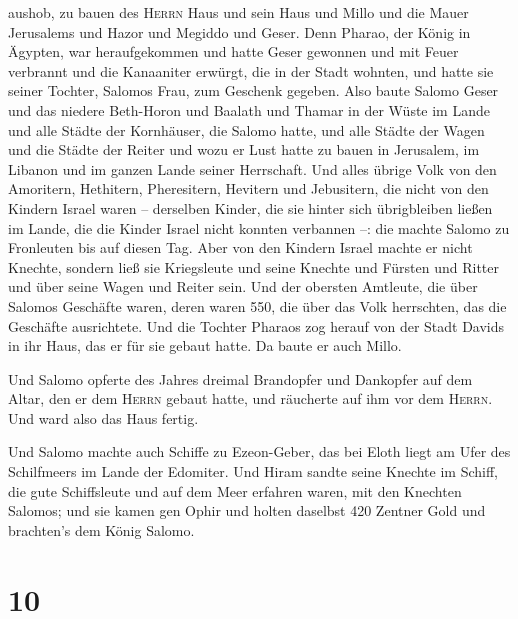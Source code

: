 aushob, zu bauen des \textsc{Herrn} Haus und sein Haus und Millo und die
Mauer Jerusalems und Hazor und Megiddo und Geser.  Denn
Pharao, der König in Ägypten, war heraufgekommen und hatte Geser
gewonnen und mit Feuer verbrannt und die Kanaaniter erwürgt, die in der
Stadt wohnten, und hatte sie seiner Tochter, Salomos Frau, zum Geschenk
gegeben.  Also baute Salomo Geser und das niedere
Beth-Horon  und Baalath und Thamar in der Wüste im Lande
 und alle Städte der Kornhäuser, die Salomo hatte, und
alle Städte der Wagen und die Städte der Reiter und wozu er Lust hatte
zu bauen in Jerusalem, im Libanon und im ganzen Lande seiner Herrschaft.
 Und alles übrige Volk von den Amoritern, Hethitern,
Pheresitern, Hevitern und Jebusitern, die nicht von den Kindern Israel
waren --  derselben Kinder, die sie hinter sich
übrigbleiben ließen im Lande, die die Kinder Israel nicht konnten
verbannen --: die machte Salomo zu Fronleuten bis auf diesen Tag.
 Aber von den Kindern Israel machte er nicht Knechte,
sondern ließ sie Kriegsleute und seine Knechte und Fürsten und Ritter
und über seine Wagen und Reiter sein.  Und der obersten
Amtleute, die über Salomos Geschäfte waren, deren waren 550, die über
das Volk herrschten, das die Geschäfte ausrichtete.  Und
die Tochter Pharaos zog herauf von der Stadt Davids in ihr Haus, das er
für sie gebaut hatte. Da baute er auch Millo.

 Und Salomo opferte des Jahres dreimal Brandopfer und
Dankopfer auf dem Altar, den er dem \textsc{Herrn} gebaut hatte, und
räucherte auf ihm vor dem \textsc{Herrn}. Und ward also das Haus fertig.

 Und Salomo machte auch Schiffe zu Ezeon-Geber, das bei
Eloth liegt am Ufer des Schilfmeers im Lande der Edomiter.
 Und Hiram sandte seine Knechte im Schiff, die gute
Schiffsleute und auf dem Meer erfahren waren, mit den Knechten Salomos;
 und sie kamen gen Ophir und holten daselbst 420 Zentner
Gold und brachten's dem König Salomo.

\hypertarget{section-9}{%
\section{10}\label{section-9}}

